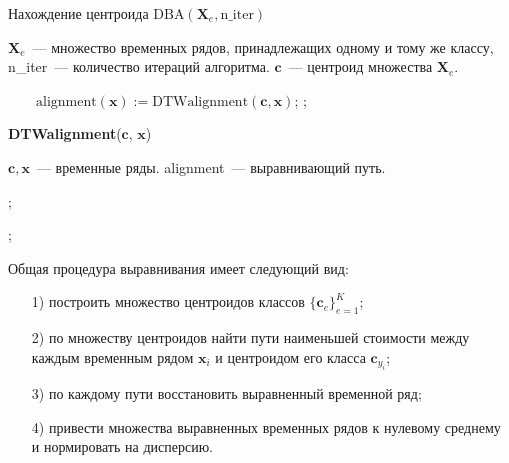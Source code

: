 \begin{algorithm}
	\caption{Нахождение центроида $\text{DBA}(\mathbf{X}_e, \text{n\_iter})$}
	\label{DBA_pseudo}
	\begin{algorithmic}[1]
		\REQUIRE $\mathbf{X}_e$~--- множество временных рядов, принадлежащих одному и тому же классу, n\_iter~--- количество итераций алгоритма.
		\ENSURE $\mathbf{c}$~--- центроид множества $\mathbf{X}_e$.
		
		\STATEx $ \quad \quad \text{alignment}(\mathbf{x}) := \text{DTWalignment}(\mathbf{c}, \mathbf{x})$;
		\ENDFOR
		;
		\ENDFOR
	\end{algorithmic}

	\textbf{DTWalignment}($\mathbf{c}$, $\mathbf{x}$)
	\begin{algorithmic}[1]
		\REQUIRE $\mathbf{c}, \mathbf{x}$~--- временные ряды.
		\ENSURE alignment~--- выравнивающий путь.
		
		;
		
		;
	\end{algorithmic}
\end{algorithm}
\newpage
Общая процедура выравнивания имеет следующий вид:
\begin{itemize}
	\item[1)]
	построить множество центроидов классов $\{\mathbf{c}_e\}_{e = 1}^K$;
	\item[2)]
	по множеству центроидов найти пути наименьшей стоимости между каждым
	временным рядом $\mathbf{x}_i$ и центроидом его класса $\mathbf{c}_{y_i}$;
	\item[3)]
	по каждому пути восстановить выравненный временной ряд;
	\item[4)]
	привести множества выравненных временных рядов к нулевому среднему и нормировать на дисперсию.
\end{itemize}

